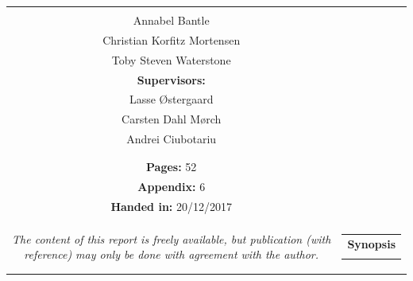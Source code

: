 \begin{titlepage}
\begin{nopagebreak}
{\begin{tabular}{cc}
{{\textbf{Participants:}\\
Annabel Bantle \\
Christian Korfitz Mortensen\\
Toby Steven Waterstone\\



\textbf{Supervisors:}\\
Lasse Østergaard\\
Carsten Dahl Mørch\\
Andrei Ciubotariu
}\\
\\
\\
\textbf{Pages:} 52\\
\textbf{Appendix:} 6 \\
\textbf{Handed in:} 20/12/2017\\
\\
\textit{The content of this report is freely available, but publication (with reference) may only be done with
	agreement with the author.}
\vfill } &
\parbox{7cm}{
  \vspace{.15cm}
  \hfill
  \begin{tabular}{l}
  {\textbf{Synopsis}}\bigskip \\
  \fbox{
    \parbox{6.5cm}{\bigskip
     {\vfill{\small 
     \bigskip}}
     }}
   \end{tabular}}
\end{tabular}} %



\end{nopagebreak}
\end{titlepage}
%